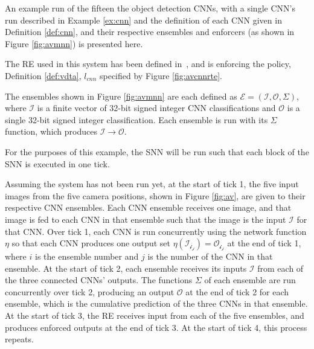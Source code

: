 \begin{example}
	\label{ex:runsnn}
	An example run of the fifteen the object detection \acp{CNN}, with a single \ac{CNN}'s run described in Example \ref{ex:cnn} and the definition of each \ac{CNN} given in Definition \ref{def:cnn}, and their respective ensembles and enforcers (as shown in Figure \ref{fig:avmnn}) is presented here.
	
	The \ac{RE} used in this system has been defined in~\cite{recps}, and is enforcing the policy, Definition \ref{def:vdta}, $l_{cnn}$ specified by Figure \ref{fig:avcnnrte}.
	
	The ensembles shown in Figure \ref{fig:avmnn} are each defined as $\mathcal{E} = (\mathcal{I}, \mathcal{O}, \Sigma)$, where $\mathcal{I}$ is a finite vector of 32-bit signed integer \ac{CNN} classifications and $\mathcal{O}$ is a single 32-bit signed integer classification.
	Each ensemble is run with its $\Sigma$ function, which produces $\mathcal{I} \rightarrow \mathcal{O}$.
	
	
	For the purposes of this example, the \ac{SNN} will be run such that each block of the \ac{SNN} is executed in one tick.
	
	Assuming the system has not been run yet, at the start of tick 1, the five input images from the five camera positions, shown in Figure \ref{fig:av}, are given to their respective \ac{CNN} ensembles.
	Each \ac{CNN} ensemble receives one image, and that image is fed to each \ac{CNN} in that ensemble such that the image is the input $\mathcal{I}$ for that \ac{CNN}.
	Over tick 1, each \ac{CNN} is run concurrently using the network function $\eta$ so that each \ac{CNN} produces one output set $\eta(\mathcal{I_{i_j}}) = \mathcal{O_{i_j}}$ at the end of tick 1, where $i$ is the ensemble number and $j$ is the number of the \ac{CNN} in that ensemble.
	At the start of tick 2, each ensemble receives its inputs $\mathcal{I}$ from each of the three connected \acp{CNN}' outputs.
	The functions $\Sigma$ of each ensemble are run concurrently over tick 2, producing an output $\mathcal{O}$ at the end of tick 2 for each ensemble, which is the cumulative prediction of the three \acp{CNN} in that ensemble.
	At the start of tick 3, the \ac{RE} receives input from each of the five ensembles, and produces enforced outputs at the end of tick 3.
	At the start of tick 4, this process repeats.
\end{example}

